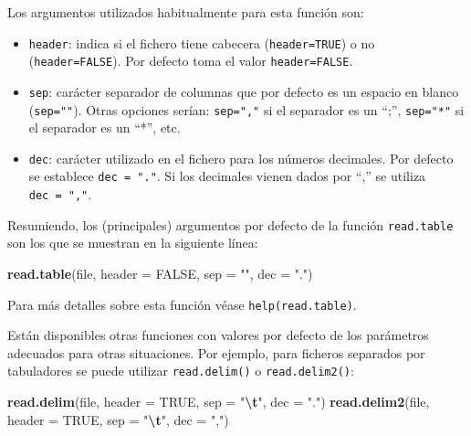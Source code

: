 \documentclass[
]{book}
\newenvironment{Shaded}{\begin{snugshade}}{\end{snugshade}}
\newcommand{\AttributeTok}[1]{\textcolor[rgb]{0.13,0.29,0.53}{#1}}
\newcommand{\ConstantTok}[1]{\textcolor[rgb]{0.56,0.35,0.01}{#1}}
\newcommand{\FunctionTok}[1]{\textcolor[rgb]{0.13,0.29,0.53}{\textbf{#1}}}
\newcommand{\NormalTok}[1]{#1}
\newcommand{\SpecialCharTok}[1]{\textcolor[rgb]{0.81,0.36,0.00}{\textbf{#1}}}
\newcommand{\StringTok}[1]{\textcolor[rgb]{0.31,0.60,0.02}{#1}}
\theoremstyle{break}
\theoremstyle{nonumberplain}
\begin{document}
Los argumentos utilizados habitualmente para esta función son:

\begin{itemize}
\item
  \texttt{header}: indica si el fichero tiene cabecera (\texttt{header=TRUE}) o no
  (\texttt{header=FALSE}). Por defecto toma el valor \texttt{header=FALSE}.
\item
  \texttt{sep}: carácter separador de columnas que por defecto es un espacio
  en blanco (\texttt{sep=""}). Otras opciones serían: \texttt{sep=","} si el separador es
  un ``;'', \texttt{sep="*"} si el separador es un ``*'', etc.
\item
  \texttt{dec}: carácter utilizado en el fichero para los números decimales.
  Por defecto se establece \texttt{dec\ =\ "."}. Si los decimales vienen dados
  por ``,'' se utiliza \texttt{dec\ =\ ","}.
\end{itemize}

Resumiendo, los (principales) argumentos por defecto de la función
\texttt{read.table} son los que se muestran en la siguiente línea:

\begin{Shaded}
\begin{Highlighting}[]
\FunctionTok{read.table}\NormalTok{(file, }\AttributeTok{header =} \ConstantTok{FALSE}\NormalTok{, }\AttributeTok{sep =} \StringTok{""}\NormalTok{, }\AttributeTok{dec =} \StringTok{"."}\NormalTok{)  }
\end{Highlighting}
\end{Shaded}

Para más detalles sobre esta función véase
\texttt{help(read.table)}.

Están disponibles otras funciones con valores por defecto de los parámetros
adecuados para otras situaciones. Por ejemplo, para ficheros separados por tabuladores
se puede utilizar \texttt{read.delim()} o \texttt{read.delim2()}:

\begin{Shaded}
\begin{Highlighting}[]
\FunctionTok{read.delim}\NormalTok{(file, }\AttributeTok{header =} \ConstantTok{TRUE}\NormalTok{, }\AttributeTok{sep =} \StringTok{"}\SpecialCharTok{\textbackslash{}t}\StringTok{"}\NormalTok{, }\AttributeTok{dec =} \StringTok{"."}\NormalTok{)}
\FunctionTok{read.delim2}\NormalTok{(file, }\AttributeTok{header =} \ConstantTok{TRUE}\NormalTok{, }\AttributeTok{sep =} \StringTok{"}\SpecialCharTok{\textbackslash{}t}\StringTok{"}\NormalTok{, }\AttributeTok{dec =} \StringTok{","}\NormalTok{)}
\end{Highlighting}
\end{Shaded}
\end{document}
